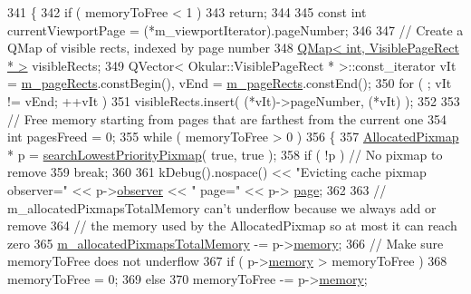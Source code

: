 \begin{DoxyCode}
341 \{
342     \textcolor{keywordflow}{if} ( memoryToFree < 1 )
343         \textcolor{keywordflow}{return};
344 
345     \textcolor{keyword}{const} \textcolor{keywordtype}{int} currentViewportPage = (*m\_viewportIterator).pageNumber;
346 
347     \textcolor{comment}{// Create a QMap of visible rects, indexed by page number}
348     \hyperlink{classQMap}{QMap< int, VisiblePageRect * >} visibleRects;
349     QVector< Okular::VisiblePageRect * >::const\_iterator vIt = \hyperlink{classOkular_1_1DocumentPrivate_a2d167614d4dc602ada64ab925cee6dce}{m\_pageRects}.constBegin(), vEnd = 
      \hyperlink{classOkular_1_1DocumentPrivate_a2d167614d4dc602ada64ab925cee6dce}{m\_pageRects}.constEnd();
350     \textcolor{keywordflow}{for} ( ; vIt != vEnd; ++vIt )
351         visibleRects.insert( (*vIt)->pageNumber, (*vIt) );
352 
353     \textcolor{comment}{// Free memory starting from pages that are farthest from the current one}
354     \textcolor{keywordtype}{int} pagesFreed = 0;
355     \textcolor{keywordflow}{while} ( memoryToFree > 0 )
356     \{
357         \hyperlink{structAllocatedPixmap}{AllocatedPixmap} * p = \hyperlink{classOkular_1_1DocumentPrivate_a751cdd88fe8ba456a89f6c998a9ae35a}{searchLowestPriorityPixmap}( \textcolor{keyword}{true}, \textcolor{keyword}{
      true} );
358         \textcolor{keywordflow}{if} ( !p ) \textcolor{comment}{// No pixmap to remove}
359             \textcolor{keywordflow}{break};
360 
361         kDebug().nospace() << \textcolor{stringliteral}{"Evicting cache pixmap observer="} << p->\hyperlink{structAllocatedPixmap_a5ee1fe9a6b1a37583c0ea54045cc7800}{observer} << \textcolor{stringliteral}{" page="} << p->
      \hyperlink{structAllocatedPixmap_a197c0639216aa0819deb72fd8705d115}{page};
362 
363         \textcolor{comment}{// m\_allocatedPixmapsTotalMemory can't underflow because we always add or remove}
364         \textcolor{comment}{// the memory used by the AllocatedPixmap so at most it can reach zero}
365         \hyperlink{classOkular_1_1DocumentPrivate_accbd72ead7fca72852b516f580d2abf1}{m\_allocatedPixmapsTotalMemory} -= p->\hyperlink{structAllocatedPixmap_a8fdfc9d87d0ce0852716295895606be0}{memory};
366         \textcolor{comment}{// Make sure memoryToFree does not underflow}
367         \textcolor{keywordflow}{if} ( p->\hyperlink{structAllocatedPixmap_a8fdfc9d87d0ce0852716295895606be0}{memory} > memoryToFree )
368             memoryToFree = 0;
369         \textcolor{keywordflow}{else}
370             memoryToFree -= p->\hyperlink{structAllocatedPixmap_a8fdfc9d87d0ce0852716295895606be0}{memory};

\end{DoxyCode}
